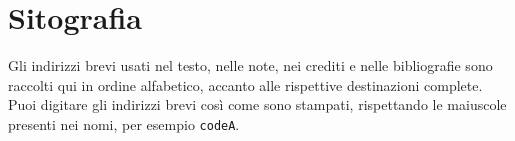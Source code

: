 \chapter*{Sitografia}
\label{sitografia}

Gli indirizzi brevi usati nel testo, nelle note, nei crediti e nelle bibliografie
sono raccolti qui in ordine alfabetico, accanto alle rispettive destinazioni
complete. Puoi digitare gli indirizzi brevi così come sono stampati, rispettando
le maiuscole presenti nei nomi, per esempio \texttt{codeA}.

